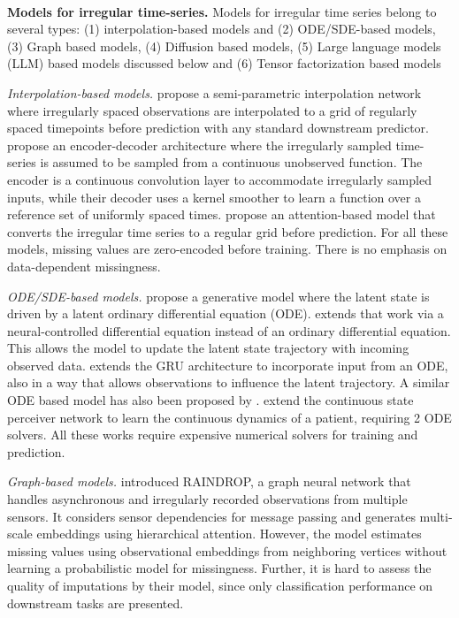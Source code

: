 ~\\
\noindent \textbf{Models for irregular time-series.}
Models for irregular time series belong to several types: (1) interpolation-based models and (2) ODE/SDE-based models, (3) Graph based models, (4) Diffusion based models, (5) Large language models (LLM) based models discussed below and (6) Tensor factorization based models

\emph{Interpolation-based models.} \citet{shukla2019interpolation} propose a semi-parametric  interpolation network where irregularly spaced observations are interpolated to a grid of regularly spaced timepoints before prediction with any standard downstream predictor. \citet{li2020learning} propose an encoder-decoder architecture where the irregularly sampled time-series is assumed to be sampled from a continuous unobserved function. The encoder is a continuous convolution layer to accommodate irregularly sampled inputs, while their decoder uses a kernel smoother to learn a function over a reference set of uniformly spaced times. \cite{shukla2021multitime} propose an attention-based model that converts the irregular time series to a regular grid before prediction. 
For all these models, missing values are zero-encoded before training. There is no emphasis on data-dependent missingness.

\emph{ODE/SDE-based models.} \citet{rubanova2019latent} propose a generative model where the latent state is driven by a latent ordinary differential equation (ODE).  
\citet{kidger2020neural} extends that work via a neural-controlled differential equation instead of an ordinary differential equation. 
This allows the model to update the latent state trajectory with incoming observed data. \cite{de2019gru} extends the GRU architecture to incorporate input from an ODE, also in a way that allows observations to influence the latent trajectory. A similar ODE based model has also been proposed by \citet{jia2019neural}.
\cite{chauhan2022coper} extend the continuous state perceiver network \citep{jaegle2021perceiver} to learn the continuous dynamics of a patient, requiring 2 ODE solvers. 
All these works require expensive numerical solvers for training and prediction.

\emph{Graph-based models.} 
\citet{zhang2021graph} introduced RAINDROP, a graph neural network that handles asynchronous and irregularly recorded observations from multiple sensors. It considers sensor dependencies for message passing and generates multi-scale embeddings using hierarchical attention. However, the model estimates missing values using observational embeddings from neighboring vertices without learning a probabilistic model for missingness. Further, it is hard to assess the quality of imputations by their model, since only classification performance on downstream tasks are presented.

